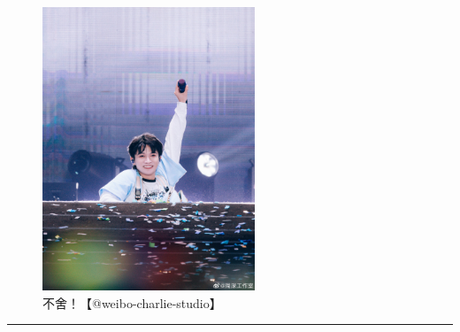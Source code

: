 \documentclass[]{ctexbook}
\begin{document}
\begin{figure}

{\centering \includegraphics[width=180pt]{img/suzhou20241110/003} 

}

\caption{不舍！【@weibo-charlie-studio】}\label{fig:unnamed-chunk-116}
\end{figure}

\begin{center}\rule{0.5\linewidth}{0.5pt}\end{center}
\end{document}
